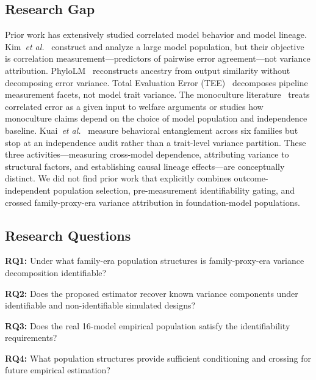 \documentclass{ieeeaccess}
\theoremstyle{definition}
\theoremstyle{plain}
\begin{document}
\subsection{Research Gap}
Prior work has extensively studied correlated model behavior and model lineage. Kim~\textit{et al.}~\cite{kim2025} construct and analyze a large model population, but their objective is correlation measurement---predictors of pairwise error agreement---not variance attribution. PhyloLM~\cite{phylolm2024} reconstructs ancestry from output similarity without decomposing error variance. Total Evaluation Error (TEE)~\cite{messing2026} decomposes pipeline measurement facets, not model trait variance. The monoculture literature~\cite{kleinberg2021,bommasani2022,jo2026} treats correlated error as a given input to welfare arguments or studies how monoculture claims depend on the choice of model population and independence baseline. Kuai~\textit{et al.}~\cite{kuai2026} measure behavioral entanglement across six families but stop at an independence audit rather than a trait-level variance partition. These three activities---measuring cross-model dependence, attributing variance to structural factors, and establishing causal lineage effects---are conceptually distinct. We did not find prior work that explicitly combines outcome-independent population selection, pre-measurement identifiability gating, and crossed family-proxy-era variance attribution in foundation-model populations.

\subsection{Research Questions}
\textbf{RQ1:} Under what family-era population structures is family-proxy-era variance decomposition identifiable?

\textbf{RQ2:} Does the proposed estimator recover known variance components under identifiable and non-identifiable simulated designs?

\textbf{RQ3:} Does the real 16-model empirical population satisfy the identifiability requirements?

\textbf{RQ4:} What population structures provide sufficient conditioning and crossing for future empirical estimation?
\end{document}
